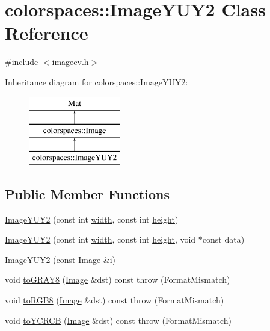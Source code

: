 \hypertarget{classcolorspaces_1_1_image_y_u_y2}{}\section{colorspaces\+:\+:Image\+Y\+U\+Y2 Class Reference}
\label{classcolorspaces_1_1_image_y_u_y2}


{\ttfamily \#include $<$imagecv.\+h$>$}

Inheritance diagram for colorspaces\+:\+:Image\+Y\+U\+Y2\+:\begin{figure}[H]
\begin{center}
\leavevmode
\includegraphics[height=3.000000cm]{classcolorspaces_1_1_image_y_u_y2}
\end{center}
\end{figure}
\subsection*{Public Member Functions}
\begin{DoxyCompactItemize}
\item 
\hyperlink{classcolorspaces_1_1_image_y_u_y2_ae77eecb2d0ea17a1ccaddac374e5d61b}{Image\+Y\+U\+Y2} (const int \hyperlink{classcolorspaces_1_1_image_ab80af7d4797110c23ed575b329ec7c4f}{width}, const int \hyperlink{classcolorspaces_1_1_image_a99a05ebd37f61215b2c3042ecaefdbfc}{height})
\item 
\hyperlink{classcolorspaces_1_1_image_y_u_y2_a918f2f42079ab1fb39011879cb8665cf}{Image\+Y\+U\+Y2} (const int \hyperlink{classcolorspaces_1_1_image_ab80af7d4797110c23ed575b329ec7c4f}{width}, const int \hyperlink{classcolorspaces_1_1_image_a99a05ebd37f61215b2c3042ecaefdbfc}{height}, void $\ast$const data)
\item 
\hyperlink{classcolorspaces_1_1_image_y_u_y2_aae420889824945d630e9fbaf77e869ad}{Image\+Y\+U\+Y2} (const \hyperlink{classcolorspaces_1_1_image}{Image} \&i)
\item 
void \hyperlink{classcolorspaces_1_1_image_y_u_y2_a48eb29de1f18175ce5c7c2d57a1de648}{to\+G\+R\+A\+Y8} (\hyperlink{classcolorspaces_1_1_image}{Image} \&dst) const  throw (\+Format\+Mismatch)
\item 
void \hyperlink{classcolorspaces_1_1_image_y_u_y2_a2fd187ef7a820405b6ca0d29589cab04}{to\+R\+G\+B8} (\hyperlink{classcolorspaces_1_1_image}{Image} \&dst) const  throw (\+Format\+Mismatch)
\item 
void \hyperlink{classcolorspaces_1_1_image_y_u_y2_a2aa1dd77495bccf2f588a0dd620e7bbb}{to\+Y\+C\+R\+CB} (\hyperlink{classcolorspaces_1_1_image}{Image} \&dst) const  throw (\+Format\+Mismatch)
\end{DoxyCompactItemize}
